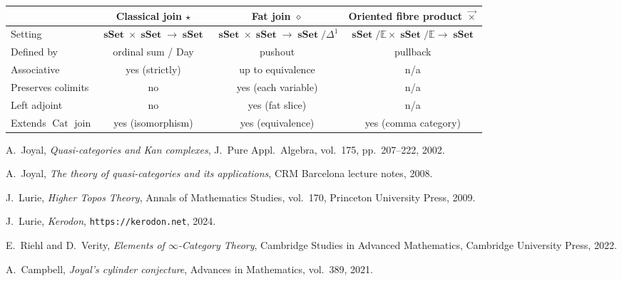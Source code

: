 \documentclass{article}
\theoremstyle{definition}
\newcommand{\E}{\mathbb{E}}
\DeclareMathOperator{\Cat}{Cat}
\DeclareMathOperator{\sSet}{\mathbf{sSet}}
\begin{document}
\begin{center}
\renewcommand{\arraystretch}{1.4}
\begin{tabular}{l c c c}
	\hline
	& \textbf{Classical join} $\star$ & \textbf{Fat join} $\diamond$ & \textbf{Oriented fibre product} $\vec{\times}$ \\
	\hline
	Setting & $\sSet \times \sSet \to \sSet$ & $\sSet \times \sSet \to \sSet/\Delta^1$ & $\sSet/\E \times \sSet/\E \to \sSet$ \\
	Defined by & ordinal sum / Day & pushout & pullback \\
	Associative & yes (strictly) & up to equivalence & n/a \\
	Preserves colimits & no & yes (each variable) & n/a \\
	Left adjoint & no & yes (fat slice) & n/a \\
	Extends $\Cat$ join & yes (isomorphism) & yes (equivalence) & yes (comma category) \\
	\hline
\end{tabular}
\end{center}

\begin{thebibliography}{9}
	A.~Joyal, \emph{Quasi-categories and Kan complexes}, J.~Pure Appl.~Algebra, vol.~175, pp.~207--222, 2002.

	A.~Joyal, \emph{The theory of quasi-categories and its applications}, CRM Barcelona lecture notes, 2008.

	J.~Lurie, \emph{Higher Topos Theory}, Annals of Mathematics Studies, vol.~170, Princeton University Press, 2009.

	J.~Lurie, \emph{Kerodon}, \texttt{https://kerodon.net}, 2024.

	E.~Riehl and D.~Verity, \emph{Elements of $\infty$-Category Theory}, Cambridge Studies in Advanced Mathematics, Cambridge University Press, 2022.

	A.~Campbell, \emph{Joyal's cylinder conjecture}, Advances in Mathematics, vol.~389, 2021.
\end{thebibliography}
\end{document}

